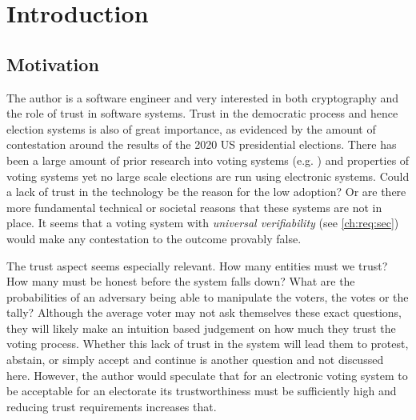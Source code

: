 \chapter{Introduction}
\label{ch:intro}

\section{Motivation}
\label{ch:intro:motiv}

The author is a software engineer and very interested in both cryptography and the role of trust in software systems. Trust in the democratic process and hence election systems is also of great importance, as evidenced by the amount of contestation around the results of the 2020 US presidential elections. There has been a large amount of prior research into voting systems (e.g. \cite{
    panjaSecureEndtoendVerifiable2018,
    mccorrySmartContractBoardroom2017,
    liuEvotingProtocolBased2017,
    yangBlockchainVotingPublicly2020,
    spadaforaCoercionResistantBlockchainBasedEVoting2020,
    dimtiriouEfficientCoercionfreeUniversally2019,
    tsoukalasHeliosZeus2013,
    xiaVersatilePretVoter2010,
    ryanPrEtVoterVoterVerifiable2010,
    yuPlatformindependentSecureBlockchainBased2018,
    seifelnasrScalableOpenVoteNetwork2020,
    gajekTrustlessCensorshipResilientScalable2019,
    chillottiHomomorphicLWEBased}) and properties of voting systems yet no large scale elections are run using electronic systems. Could a lack of trust in the technology be the reason for the low adoption? Or are there more fundamental technical or societal reasons that these systems are not in place. It seems that a voting system with \emph{universal verifiability} (see \autoref{ch:req:sec}) would make any contestation to the outcome provably false.

The trust aspect seems especially relevant. How many entities must we trust? How many must be honest before the system falls down? What are the probabilities of an adversary being able to manipulate the voters, the votes or the tally? Although the average voter may not ask themselves these exact questions, they will likely make an intuition based judgement on how much they trust the voting process. Whether this lack of trust in the system will lead them to protest, abstain, or simply accept and continue is another question and not discussed here. However, the author would speculate that for an electronic voting system to be acceptable for an electorate its trustworthiness must be sufficiently high and reducing trust requirements increases that.

